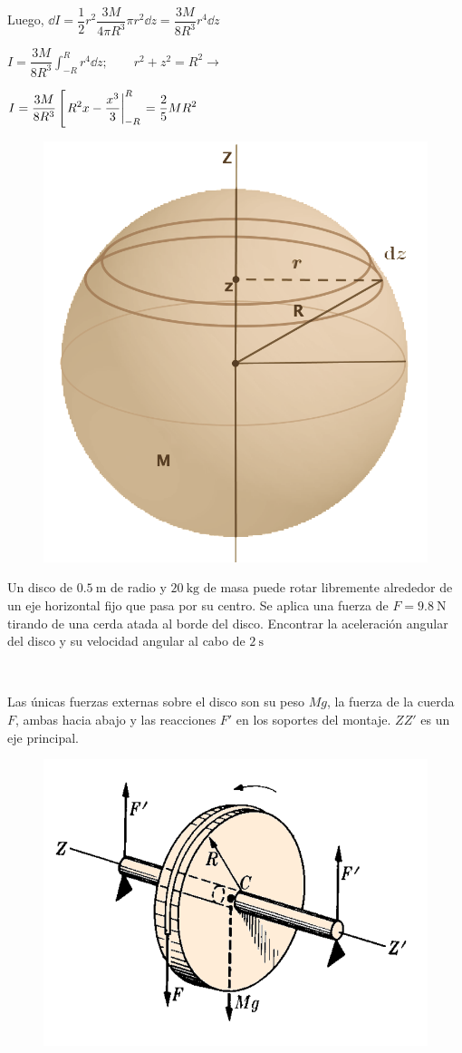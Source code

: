 \vspace{40mm} %

\begin{multicols}{2}
Luego, $\dd I=\dfrac 1 2 r^2 \dfrac{3M}{4\pi R^3} \pi r^2 \dd z= \dfrac{3M}{8R^3}r^4 \dd z$

$\displaystyle I= \dfrac{3M}{8R^3} \int_{-R}^{R} r^4 \dd z;\qquad r^2+z^2=R^2 \to $

$\displaystyle I=\dfrac{3M}{8R^3} \left[ \eval{R^2x-\dfrac{x^3}{3}}_{-R}^{R}\right. = \dfrac 2 5 MR^2$
\begin{figure}[H]
	\centering
	\includegraphics[width=.3\textwidth]{imagenes/imagenes16/T16IM18.png}
\end{figure}
\end{multicols}

\begin{prob}
Un disco de $0.5\ \mathrm{m}$  de radio y $20\ \mathrm{kg}$ de masa	puede rotar libremente alrededor de un eje horizontal fijo que pasa por su centro. Se aplica una fuerza de $F=9.8\ \mathrm{N}$ tirando de una cerda atada al borde del disco. Encontrar la aceleración angular del disco y su velocidad angular al cabo de $2\ \mathrm{s}$
\end{prob}


\begin{multicols}{2}
$\quad$

Las únicas fuerzas externas sobre el disco son su peso $Mg$, la fuerza de la cuerda $F$, ambas hacia abajo y las reacciones $F'$ en los soportes del montaje. $ZZ'$ es un eje principal.
\begin{figure}[H]
	\centering
	\includegraphics[width=.5\textwidth]{imagenes/imagenes16/T16IM11.png}
\end{figure}
\end{multicols}



